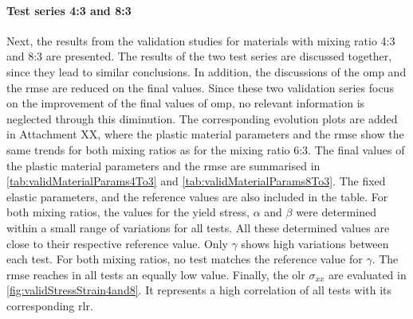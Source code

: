 
\paragraph{Test series 4:3 and 8:3}
Next, the results from the validation studies for materials with mixing ratio 4:3 and 8:3 are presented. The results of the two test series are discussed together, since they lead to similar conclusions. In addition, the discussions of the \acrlong{omp} and the \acrshort{rmse} are reduced on the final values.  Since these two validation series focus on the improvement of the final values of \acrlong{omp}, no relevant information is neglected through this diminution.
The corresponding evolution plots are added in Attachment XX, where the plastic material parameters and the \acrshort{rmse} show the same trends for both mixing ratios as for the mixing ratio 6:3.
The final values of the plastic material parameters and the \acrshort{rmse} are summarised in \autoref{tab:validMaterialParams4To3} and \autoref{tab:validMaterialParams8To3}.
The fixed elastic parameters, and the reference values are also included in the table.
For both mixing ratios, the values for the yield stress, $\alpha$ and $\beta$ were determined within a small range of variations for all tests. All these determined values are close to their respective reference value.
Only $\gamma$ shows high variations between each test. For both mixing ratios, no test matches the reference value for $\gamma$. The \acrshort{rmse} reaches in all tests an equally low value. Finally, the \acrlong{olr} $\sigma_{xx}$ are evaluated in \autoref{fig:validStressStrain4and8}. It represents a high correlation of all tests with its corresponding \acrlong{rlr}.

